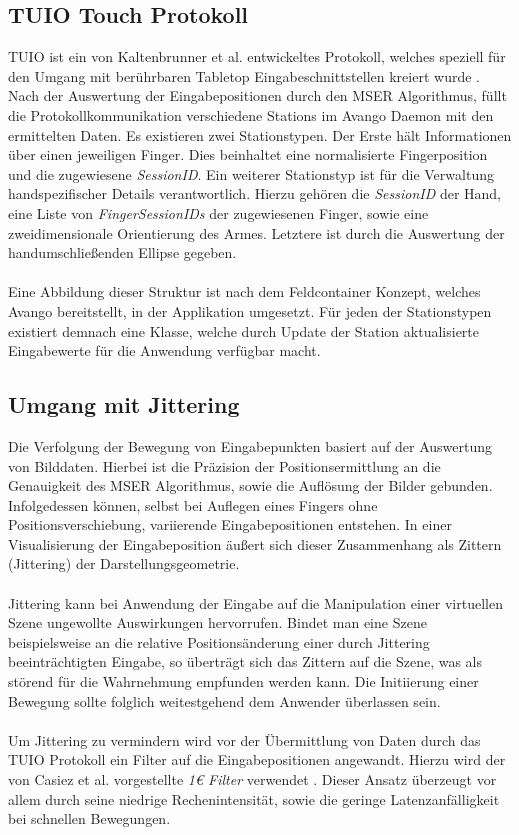 \subsection{TUIO Touch Protokoll}
\label{subsec:tuio_touch_protokoll}

TUIO ist ein von Kaltenbrunner et al. entwickeltes Protokoll, welches speziell für den Umgang mit berührbaren Tabletop Eingabeschnittstellen kreiert wurde \cite{kaltenbrunner:2005}. Nach der Auswertung der Eingabepositionen durch den MSER Algorithmus, füllt die Protokollkommunikation verschiedene Stations im Avango Daemon mit den ermittelten Daten. Es existieren zwei Stationstypen. Der Erste hält Informationen über einen jeweiligen Finger. Dies beinhaltet eine normalisierte Fingerposition und die zugewiesene \emph{SessionID}. Ein weiterer Stationstyp ist für die Verwaltung handspezifischer Details verantwortlich. Hierzu gehören die \emph{SessionID} der Hand, eine Liste von \emph{FingerSessionIDs} der zugewiesenen Finger, sowie eine zweidimensionale Orientierung des Armes. Letztere ist durch die Auswertung der handumschließenden Ellipse gegeben. 
\\\\
Eine Abbildung dieser Struktur ist nach dem Feldcontainer Konzept, welches Avango bereitstellt, in der Applikation umgesetzt. Für jeden der Stationstypen existiert demnach eine Klasse, welche durch Update der Station aktualisierte Eingabewerte für die Anwendung verfügbar macht.


\subsection{Umgang mit Jittering}
\label{subsec:umgang_mit_jittering}

Die Verfolgung der Bewegung von Eingabepunkten basiert auf der Auswertung von Bilddaten. Hierbei ist die Präzision der Positionsermittlung an die Genauigkeit des MSER Algorithmus, sowie die Auflösung der Bilder gebunden. Infolgedessen können, selbst bei Auflegen eines Fingers ohne Positionsverschiebung, variierende Eingabepositionen entstehen. In einer Visualisierung der Eingabeposition äußert sich dieser Zusammenhang als Zittern (Jittering) der Darstellungsgeometrie.
\\\\
Jittering kann bei Anwendung der Eingabe auf die Manipulation einer virtuellen Szene ungewollte Auswirkungen hervorrufen. Bindet man eine Szene beispielsweise an die relative Positionsänderung einer durch Jittering beeinträchtigten Eingabe, so überträgt sich das Zittern auf die Szene, was als störend für die Wahrnehmung empfunden werden kann. Die Initiierung einer Bewegung sollte folglich weitestgehend dem Anwender überlassen sein.
\\\\ 
Um Jittering zu vermindern wird vor der Übermittlung von Daten durch das TUIO Protokoll ein Filter auf die Eingabepositionen angewandt. Hierzu wird der von Casiez et al. vorgestellte \emph{1\euro{} Filter} verwendet \cite{casiez:2012}. Dieser Ansatz überzeugt vor allem durch seine niedrige Rechenintensität, sowie die geringe Latenzanfälligkeit bei schnellen Bewegungen.


